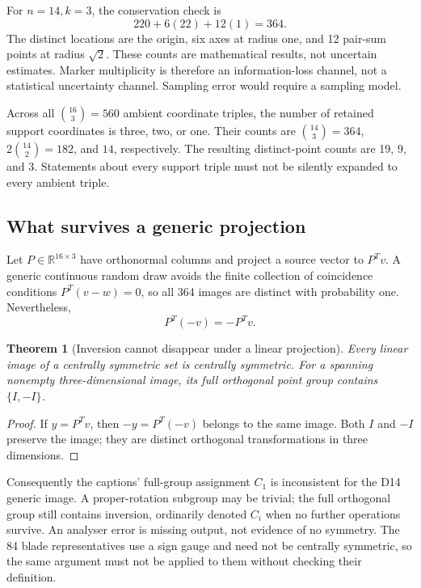 \documentclass[11pt,a4paper]{article}
\newtheorem{theorem}{Theorem}[section]\newtheorem{lemma}[theorem]{Lemma}\newtheorem{corollary}[theorem]{Corollary}\newtheorem{definition}[theorem]{Definition}\newtheorem{proposition}[theorem]{Proposition}
\begin{document}
For $n=14,k=3$, the conservation check is
\begin{equation}
220+6(22)+12(1)=364.
\end{equation}
The distinct locations are the origin, six axes at radius one, and 12 pair-sum points at radius $\sqrt2$. These counts are mathematical results, not uncertain estimates. Marker multiplicity is therefore an information-loss channel, not a statistical uncertainty channel. Sampling error would require a sampling model.

Across all $\binom{16}{3}=560$ ambient coordinate triples, the number of retained support coordinates is three, two, or one. Their counts are $\binom{14}{3}=364$, $2\binom{14}{2}=182$, and $14$, respectively. The resulting distinct-point counts are 19, 9, and 3. Statements about every support triple must not be silently expanded to every ambient triple.

\subsection{What survives a generic projection}
Let $P\in\mathbb R^{16\times3}$ have orthonormal columns and project a source vector to $P^Tv$. A generic continuous random draw avoids the finite collection of coincidence conditions $P^T(v-w)=0$, so all 364 images are distinct with probability one. Nevertheless,
\begin{equation}
P^T(-v)=-P^Tv.
\end{equation}
\begin{theorem}[Inversion cannot disappear under a linear projection]
Every linear image of a centrally symmetric set is centrally symmetric. For a spanning nonempty three-dimensional image, its full orthogonal point group contains $\{I,-I\}$.
\end{theorem}
\begin{proof}
If $y=P^Tv$, then $-y=P^T(-v)$ belongs to the same image. Both $I$ and $-I$ preserve the image; they are distinct orthogonal transformations in three dimensions.
\end{proof}
Consequently the captions' full-group assignment $C_1$ is inconsistent for the D14 generic image. A proper-rotation subgroup may be trivial; the full orthogonal group still contains inversion, ordinarily denoted $C_i$ when no further operations survive. An analyser error is missing output, not evidence of no symmetry. The 84 blade representatives use a sign gauge and need not be centrally symmetric, so the same argument must not be applied to them without checking their definition.
\end{document}
